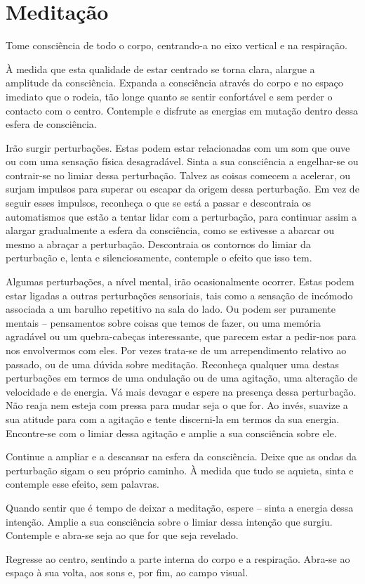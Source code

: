 
\chapter{Meditação}


Tome consciência de todo o corpo, centrando-a no eixo vertical e na respiração.

À medida que esta qualidade de estar centrado se torna clara, alargue a amplitude da consciência. Expanda a consciência através do corpo e no espaço imediato que o rodeia, tão longe quanto se sentir confortável e sem perder o contacto com o centro. Contemple e disfrute as energias em mutação dentro dessa esfera de consciência.

Irão surgir perturbações. Estas podem estar relacionadas com um som que ouve ou com uma sensação física desagradável. Sinta a sua consciência a engelhar-se ou contrair-se no limiar dessa perturbação. Talvez as coisas comecem a acelerar, ou surjam impulsos para superar ou escapar da origem dessa perturbação. Em vez de seguir esses impulsos, reconheça o que se está a passar e descontraia os automatismos que estão a tentar lidar com a perturbação, para continuar assim a alargar gradualmente a esfera da consciência, como se estivesse a abarcar ou mesmo a abraçar a perturbação. Descontraia os contornos do limiar da perturbação e, lenta e silenciosamente, contemple o efeito que isso tem.

Algumas perturbações, a nível mental, irão ocasionalmente ocorrer. Estas podem estar ligadas a outras perturbações sensoriais, tais como a sensação de incómodo associada a um barulho repetitivo na sala do lado. Ou podem ser puramente mentais -- pensamentos sobre coisas que temos de fazer, ou uma memória agradável ou um quebra-cabeças interessante, que parecem estar a pedir-nos para nos envolvermos com eles. Por vezes trata-se de um arrependimento relativo ao passado, ou de uma dúvida sobre meditação. Reconheça qualquer uma destas perturbações em termos de uma ondulação ou de uma agitação, uma alteração de velocidade e de energia. Vá mais devagar e espere na presença dessa perturbação. Não reaja nem esteja com pressa para mudar seja o que for. Ao invés, suavize a sua atitude para com a agitação e tente discerni-la em termos da sua energia. Encontre-se com o limiar dessa agitação e amplie a sua consciência sobre ele.

Continue a ampliar e a descansar na esfera da consciência. Deixe que as ondas da perturbação sigam o seu próprio caminho. À medida que tudo se aquieta, sinta e contemple esse efeito, sem palavras.

Quando sentir que é tempo de deixar a meditação, espere -- sinta a energia dessa intenção. Amplie a sua consciência sobre o limiar dessa intenção que surgiu. Contemple e abra-se seja ao que for que seja revelado.

Regresse ao centro, sentindo a parte interna do corpo e a respiração. Abra-se ao espaço à sua volta, aos sons e, por fim, ao campo visual.
